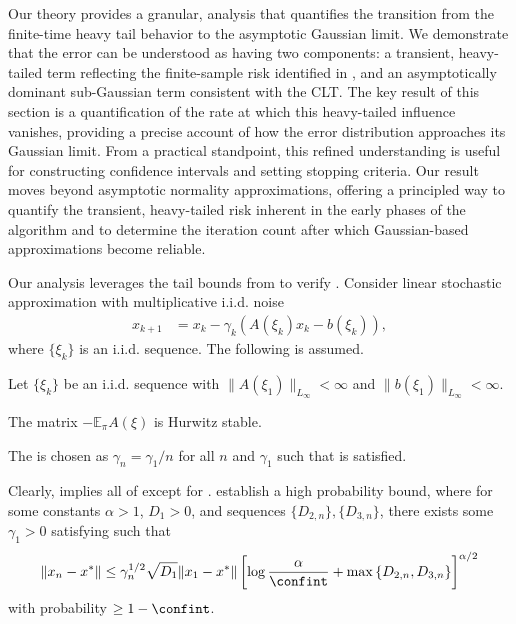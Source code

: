 \documentclass[11pt]{article}
\begin{document}
Our theory provides a granular, \nonasymptotic analysis that quantifies the transition from the finite-time heavy tail behavior to the asymptotic Gaussian limit.
We demonstrate that the error can be understood as having two components: a transient, heavy-tailed term reflecting the finite-sample risk identified in \citep{chen_contractive_concentration}, and an asymptotically dominant sub-Gaussian term consistent with the CLT. The key result of this section is a quantification of the rate at which this heavy-tailed influence vanishes, providing a precise account of how the error distribution approaches its Gaussian limit.
From a practical standpoint, this refined understanding is useful for constructing confidence intervals and setting stopping criteria. 
Our result moves beyond asymptotic normality approximations, offering a principled way to quantify the transient, heavy-tailed risk inherent in the early phases of the algorithm and to determine the iteration count after which Gaussian-based approximations become reliable.









Our analysis leverages the tail bounds from \citep{chen_contractive_concentration} to verify . 
Consider linear stochastic approximation with multiplicative i.i.d. noise
\begin{align*}
    x_{k+1} &= x_k - \gamma_k (A(\xi_k) x_k - b(\xi_k)) , 
\end{align*}
where $\{\xi_k\}$ is an i.i.d. sequence. 
The following is assumed. 
\begin{lsa}\label{ass:lsa}
    Let $\{\xi_k\}$ be an i.i.d. sequence with $\lVert A(\xi_1) \rVert_{L_\infty} < \infty$ and $\lVert b(\xi_1) \rVert_{L_\infty} < \infty$. 
    \begin{assumptionsub}
        \item The matrix $- \mathbb{E}_\pi A(\xi)$ is Hurwitz stable. 
        \item The \stepsize is chosen as $\gamma_n =\gamma_1/n$ for all $n$ and $\gamma_1$ such that  is satisfied. 
    \end{assumptionsub}    
\end{lsa}
Clearly,  implies all of  except for . 
\citet[Theorem 2.1 (a)]{chen_contractive_concentration} establish a high probability bound, where for some constants $\alpha > 1$, $D_1 > 0$, and sequences $\{D_{2,n}\}, \{D_{3,n}\}$, there exists some $\gamma_1 > 0$ satisfying  such that
\begin{equation}\label{eq:cmz_high_probability}
    \lVert x_{n} - x^* \rVert
    \leq 
    \gamma_n^{1/2} \sqrt{D_{1}} \lVert x_1 - x^* \rVert \left[\log \frac{\alpha}{\confint} + \max\left\{ D_{2, n}, D_{3, n} \right\} \right]^{\alpha/2}
\end{equation}
with probability $\geq 1 - \confint$. 
\end{document}
